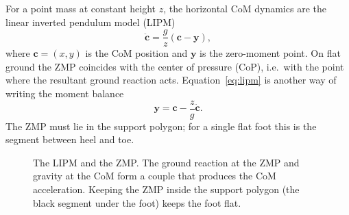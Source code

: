 \documentclass[11pt]{article}
\begin{document}
For a point mass at constant height $z$, the horizontal CoM dynamics are the
linear inverted pendulum model (LIPM)
\begin{equation}
\ddot{\mathbf{c}}=\frac{g}{z}\left(\mathbf{c}-\mathbf{y}\right),
\label{eq:lipm}
\end{equation}
where $\mathbf{c}=(x,y)$ is the CoM position and $\mathbf{y}$ is the
zero-moment point.  On flat ground the ZMP coincides with the center of
pressure (CoP), i.e.\ with the point where the resultant ground reaction acts.
Equation~\eqref{eq:lipm} is another way of writing the moment balance
\begin{equation}
\mathbf{y}=\mathbf{c}-\frac{z}{g}\ddot{\mathbf{c}} .
\label{eq:zmp}
\end{equation}
The ZMP must lie in the support polygon; for a single flat foot this is the
segment between heel and toe.

\begin{figure}[htbp]
\centering
{}
\caption{The LIPM and the ZMP.  The ground reaction at the ZMP and gravity at
the CoM form a couple that produces the CoM acceleration.  Keeping the ZMP
inside the support polygon (the black segment under the foot) keeps the foot
flat.}
\label{fig:lipm_zmp}
\end{figure}
\end{document}
